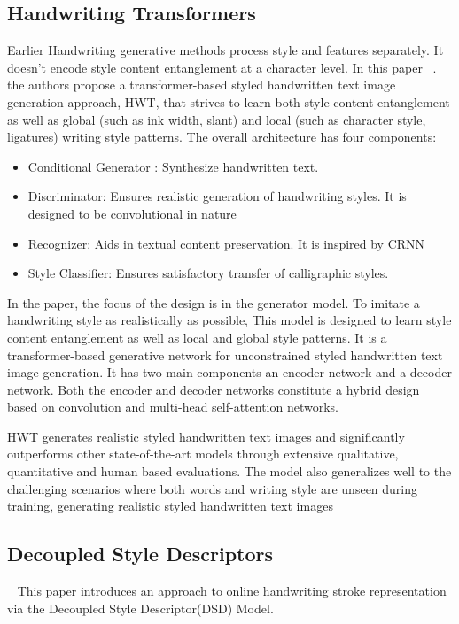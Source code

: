 \documentclass[10pt,twocolumn,letterpaper]{article}
\begin{document}
\subsection{Handwriting Transformers}
\label{subsec: HWT}
Earlier Handwriting generative methods process style and features separately. It doesn't encode style content entanglement at a character level. In this paper ~\cite{HWT}. the authors propose a transformer-based styled handwritten text image generation approach, HWT, that strives to learn both style-content entanglement as well as global (such as ink width, slant) and local (such as character style, ligatures) writing style patterns. The overall architecture has four components: 
\begin{itemize}
  \item Conditional Generator : Synthesize handwritten text.
  \item Discriminator: Ensures realistic generation of handwriting styles. It is designed to be convolutional in nature
  \item Recognizer: Aids in textual content preservation. It is inspired by CRNN
  \item Style Classifier: Ensures satisfactory transfer of calligraphic styles.
\end{itemize}

In the paper, the focus of the design is in the generator model. To imitate a handwriting style as realistically as possible, This model is designed to learn style content entanglement as well as local and global style patterns.  It is a transformer-based generative network for unconstrained styled handwritten text image generation.  It has two main components an encoder network and a decoder network.  Both the encoder and decoder networks constitute a hybrid design based on convolution and multi-head self-attention networks.

HWT generates realistic styled handwritten text images and significantly outperforms other state-of-the-art models through extensive qualitative, quantitative and human based evaluations. The model also generalizes well to the challenging scenarios where both words and writing style are unseen during training, generating realistic styled handwritten text images  \\
\subsection{Decoupled Style Descriptors} 
\label{subsec: Brush Paper}
~\cite{BRUSH-paper} This paper introduces an approach to online handwriting stroke representation via the Decoupled Style Descriptor(DSD) Model. 
\end{document}
